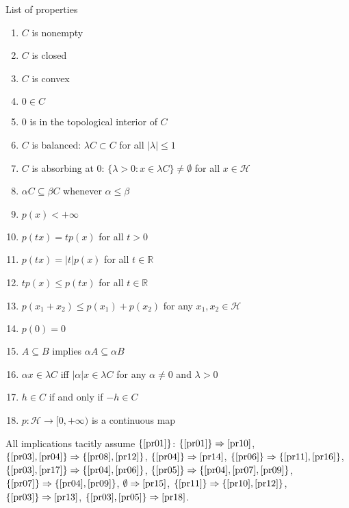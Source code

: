 \documentclass[a4paper]{article}
\newcommand{\Hcal}{\mathcal{H}}
\newcommand{\real}{\mathbb{R}}
\begin{document}
List of properties
\begin{enumerate}
  \item \label{pr01}
    $C$ is nonempty
  \item \label{pr02}
    $C$ is closed
  \item \label{pr03}
    $C$ is convex
  \item \label{pr04}
    $0 \in C$
  \item \label{pr05}
    $0$ is in the topological interior of $C$
  \item \label{pr06}
    $C$ is balanced: $\lambda C \subset C$ for all $\lvert \lambda \rvert \leq 1$
  \item \label{pr07}
    $C$ is absorbing at $0$: $\{\lambda>0\colon x \in \lambda C \} \neq \emptyset$
    for all $x\in \Hcal$
  \item \label{pr08}
    $\alpha C \subseteq \beta C$ whenever $\alpha \leq \beta$
  \item \label{pr09}
    $p(x) < +\infty$
  \item \label{pr10}
    $p(tx) = t p(x)$ for all $t > 0$
  \item \label{pr11}
    $p(tx) = \lvert t \rvert p(x)$ for all $t \in \real$
  \item \label{pr12}
    $t p(x) \leq p(t x)$ for all $t \in \real$
  \item \label{pr13}
    $p(x_1 + x_2) \leq p(x_1) + p(x_2)$ for any $x_1, x_2 \in \Hcal$
  \item \label{pr14}
    $p(0) = 0$
  \item \label{pr15}
    $A \subseteq B$ implies $\alpha A \subseteq \alpha B$
  \item \label{pr16}
    $\alpha x \in \lambda C$ iff $\lvert \alpha \rvert x \in \lambda C$ for any
    $\alpha \neq 0$ and $\lambda > 0$
  \item \label{pr17}
    $h \in C$ if and only if $-h \in C$
  \item \label{pr18}
    $p\colon \Hcal \to [0, +\infty)$ is a continuous map
\end{enumerate}
All implications tacitly assume $\{\ref{pr01}\}$:
$\{\ref{pr01}\} \Rightarrow \ref{pr10}$,
$\{\ref{pr03}, \ref{pr04}\} \Rightarrow \{\ref{pr08}, \ref{pr12}\}$,
$\{\ref{pr04}\} \Rightarrow \ref{pr14}$,
$\{\ref{pr06}\} \Rightarrow \{\ref{pr11}, \ref{pr16}\}$,
$\{\ref{pr03}, \ref{pr17}\} \Rightarrow \{\ref{pr04}, \ref{pr06}\}$,
$\{\ref{pr05}\} \Rightarrow \{\ref{pr04}, \ref{pr07}, \ref{pr09}\}$,
$\{\ref{pr07}\} \Rightarrow \{\ref{pr04}, \ref{pr09}\}$,
$\emptyset \Rightarrow \ref{pr15}$,
$\{\ref{pr11}\} \Rightarrow \{\ref{pr10}, \ref{pr12}\}$,
$\{\ref{pr03}\} \Rightarrow \ref{pr13}$,
$\{\ref{pr03}, \ref{pr05}\} \Rightarrow \ref{pr18}$.

\end{document}
